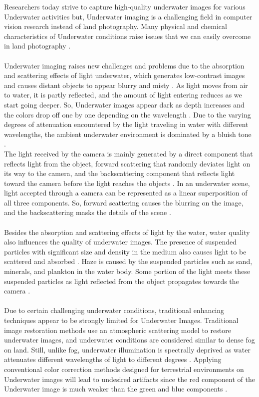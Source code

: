 \documentclass[a4paper,11pt,oneside]{article}
\begin{document}
  Researchers today strive to capture high-quality underwater images for various Underwater activities \cite{15} but, Underwater imaging is a challenging field in computer vision research instead of land photography. Many physical and chemical characteristics of Underwater conditions raise issues that we can easily overcome in land photography \cite{15}.\\
  \\
  Underwater imaging raises new challenges and problems due to the absorption and scattering effects of light underwater, which generates low-contrast images and causes distant objects to appear blurry and misty \cite{3}. As light moves from air to water, it is partly reflected, and the amount of light entering reduces as we start going deeper. So, Underwater images appear dark as depth increases and the colors drop off one by one depending on the wavelength \cite{4}. Due to the varying degrees of attenuation encountered by the light traveling in water with different wavelengths, the ambient underwater environment is dominated by a bluish tone \cite{20}.\\
  The light received by the camera is mainly generated by a direct component that reflects light from the object, forward scattering that randomly deviates light on its way to the camera, and the backscattering component that reflects light toward the camera before the light reaches the objects \cite{21}. In an underwater scene, light accepted through a camera can be represented as a linear superposition of all three components.  So, forward scattering causes the blurring on the image, and the backscattering masks the details of the scene \cite{21}.\\
  \\
  Besides the absorption and scattering effects of light by the water, water quality also influences the quality of underwater images. The presence of suspended particles with significant size and density in the medium also causes light to be scattered and absorbed \cite{8}. Haze is caused by the suspended particles such as sand, minerals, and plankton in the water body. Some portion of the light meets these suspended particles as light reflected from the object propagates towards the camera \cite{13}.\\
  \\
  Due to certain challenging underwater conditions, traditional enhancing techniques appear to be strongly limited for Underwater Images. Traditional image restoration methods use an atmospheric scattering model to restore underwater images\cite{11}, and underwater conditions are considered similar to dense fog on land. Still, unlike fog, underwater illumination is spectrally deprived as water attenuates different wavelengths of light to different degrees \cite{2}. Applying conventional color correction methods designed for terrestrial environments on Underwater images will lead to undesired artifacts since the red component of the Underwater image is much weaker than the green and blue components \cite{6}.\\
\end{document}
